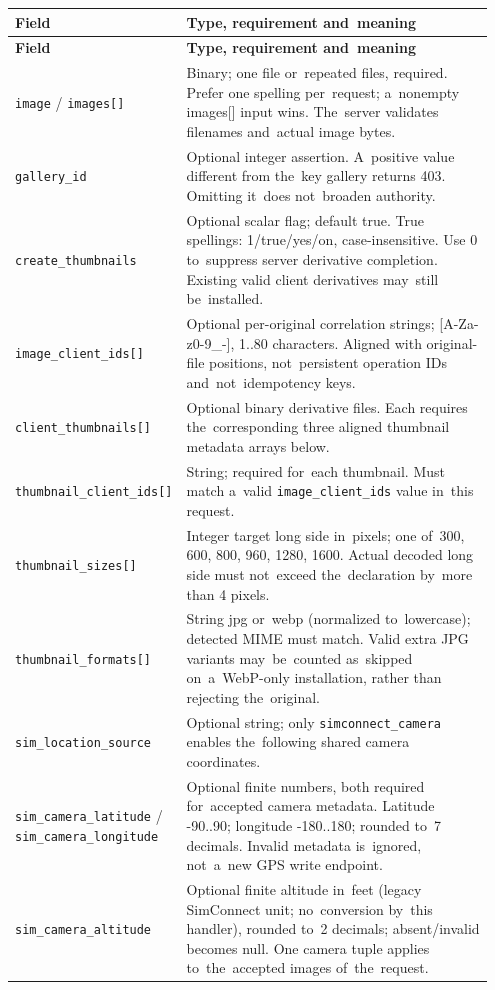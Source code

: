 \documentclass[11pt,a4paper]{article}
\newcommand{\codeword}[1]{\nolinkurl{#1}}
\begin{document}
\begin{longtable}{@{}>{\RaggedRight\arraybackslash}p{0.28\linewidth}>{\RaggedRight\arraybackslash}p{0.67\linewidth}@{}}
\toprule
\textbf{Field} & \textbf{Type, requirement and~meaning} \\
\midrule
\endfirsthead
\toprule
\textbf{Field} & \textbf{Type, requirement and~meaning} \\
\midrule
\endhead
\bottomrule
\endfoot
\codeword{image} / \codeword{images[]} & Binary; one file or~repeated files, required.
Prefer one spelling per~request; a~nonempty images[] input wins. The~server validates
filenames and~actual image bytes. \\
\codeword{gallery_id} & Optional integer assertion. A~positive value different from the~key
gallery returns 403. Omitting it~does not~broaden authority. \\
\codeword{create_thumbnails} & Optional scalar flag; default true. True spellings:
1/true/yes/on, case-insensitive. Use 0 to~suppress server derivative completion. Existing
valid client derivatives may~still be~installed. \\
\codeword{image_client_ids[]} & Optional per-original correlation strings; [A-Za-z0-9\_-],
1..80 characters. Aligned with original-file positions, not~persistent operation IDs
and~not~idempotency keys. \\
\codeword{client_thumbnails[]} & Optional binary derivative files. Each requires
the~corresponding three aligned thumbnail metadata arrays below. \\
\codeword{thumbnail_client_ids[]} & String; required for~each thumbnail. Must match a~valid
\codeword{image_client_ids} value in~this request. \\
\codeword{thumbnail_sizes[]} & Integer target long side in~pixels; one of~300, 600, 800,
960, 1280, 1600. Actual decoded long side must not~exceed the~declaration by~more than 4
pixels. \\
\codeword{thumbnail_formats[]} & String jpg or~webp (normalized to~lowercase); detected MIME
must match. Valid extra JPG variants may~be~counted as~skipped on~a~WebP-only installation,
rather than rejecting the~original. \\
\codeword{sim_location_source} & Optional string; only \codeword{simconnect_camera} enables
the~following shared camera coordinates. \\
\codeword{sim_camera_latitude} / \codeword{sim_camera_longitude} & Optional finite numbers,
both required for~accepted camera metadata. Latitude -90..90; longitude -180..180; rounded
to~7 decimals. Invalid metadata is~ignored, not~a~new GPS write endpoint. \\
\codeword{sim_camera_altitude} & Optional finite altitude in~feet (legacy SimConnect unit;
no~conversion by~this handler), rounded to~2 decimals; absent/invalid becomes null. One
camera tuple applies to~the~accepted images of~the~request. \\
\end{longtable}
\end{document}
